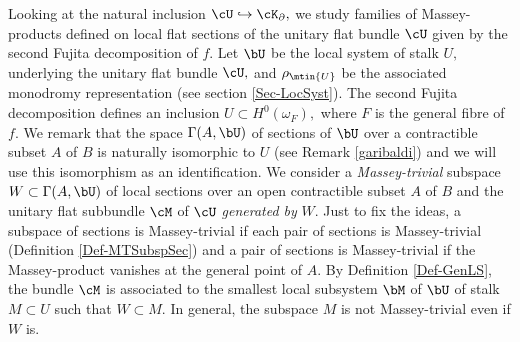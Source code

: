 \documentclass[a4paper,11pt]{amsart}
\begin{document}
Looking at the natural inclusion $\cU\hookrightarrow \cK_{\partial}, $ we study families of Massey-products defined on local flat sections of the unitary flat bundle $\cU$ given by the second Fujita decomposition of $f.$ 
Let $\bU$ be the local system of stalk $U,$ underlying the unitary flat bundle $\cU,$ and $\rho_{\mtin{U}}$ be the associated monodromy representation (see section \ref{Sec-LocSyst}). The second Fujita decomposition defines an inclusion $U\subset H^0(\omega_F),$ where $F$ is the general fibre of $f.$  We remark that the space $\Gamma(A,\bU)$ of sections of $\bU$ over a contractible subset $A$ of $B$ is naturally isomorphic to $U$ (see Remark \ref{garibaldi}) and we
will use this isomorphism as an identification. We consider a {\em Massey-trivial} subspace
 $W\subset \Gamma(A,\bU)$ of local sections over an open contractible subset  $A$ of $B$
and the unitary flat subbundle $\cM$ of $\cU$  {\em generated by} $W.$ Just to fix the ideas, a subspace of sections is Massey-trivial if each pair of sections is  Massey-trivial (Definition \ref{Def-MTSubspSec}) and a pair of sections is Massey-trivial if the Massey-product vanishes at the general point of $A.$ By Definition \ref{Def-GenLS}, the bundle $\cM$ is  associated to the smallest local subsystem $\bM$ of $\bU$ of stalk $M\subset U$ such that $W\subset M.$ In general, the subspace $M$ is not Massey-trivial even if $W$ is. 
\end{document}
